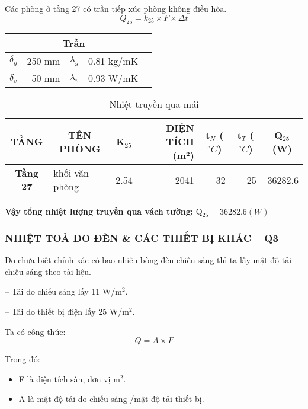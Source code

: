 Các phòng ở tầng 27 có trần tiếp xúc phòng không điều hòa.
\begin{equation*}
	Q_{25} = k_{25}\times F\times \Delta t
\end{equation*}
\begin{table}[H]
	\centering
	\begin{tabular}{|r|r|r|r|r|}
		\hline
		\multicolumn{4}{|c|}{\textbf{Trần}} \bigstrut\\
		\hline
		\textbf{{\large $\delta_{g}$}} & 250 mm & {\large $\lambda_{g}$} & 0.81 kg/mK \bigstrut\\
		\hline
		\textbf{{\large $\delta_{v}$}} & 50 mm & \textbf{{\large $\lambda_{v}$}} & 0.93 W/mK \bigstrut\\	
		\hline
	\end{tabular}
	\label{b:kct}
\end{table}
\begin{table}[H]
	\centering
	\caption{Nhiệt truyền qua mái}
	\begin{tabular}{|c|l|r|r|r|r|r|}
		\hline
		\textbf{ TẦNG} & \multicolumn{1}{c|}{\textbf{TÊN PHÒNG}} & \multicolumn{1}{c|}{\textbf{K$ _{25} $}} & \multicolumn{1}{p{6.145em}|}{\textbf{DIỆN TÍCH (m²) }} & \multicolumn{1}{c|}{\textbf{t$_{N}$ ($^{\circ}C$)}} & \multicolumn{1}{c|}{\textbf{t$_{T}$ ($^{\circ}C$)}} & \multicolumn{1}{c|}{\textbf{Q$ _{25} $(W)}} \bigstrut\\
		\hline
		\textbf{Tầng 27} & khối văn phòng & 2.54     & 2041     & 32       & 25       & 36282.6 \bigstrut\\
		\hline
	\end{tabular}%
	\label{b:ntqm}%
\end{table}%
\textbf{Vậy tổng nhiệt lượng truyền qua vách tường:} Q$_{25} = 36282.6(W)$

\subsubsection{NHIỆT TOẢ DO ĐÈN \& CÁC THIẾT BỊ KHÁC -- Q{\scriptsize 3}}

Do chưa biết chính xác có bao nhiêu bòng đèn chiếu sáng thì ta lấy mật độ tải chiếu sáng theo tài liệu.

-- Tải do chiếu sáng lấy 11 W/m$^2$.

-- Tải do thiết bị điện lấy 25 W/m$^2$.

Ta có công thức:
\begin{equation*}
	Q = A\times F
\end{equation*}

Trong đó:
\begin{itemize}[leftmargin = 2.2cm]
	\item F là diện tích sàn, đơn vị m$^2$.
	\item A là mật độ tải do chiếu sáng /mật độ tải thiết bị.
\end{itemize}


